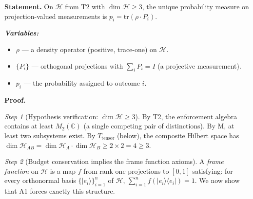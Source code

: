 \documentclass[11pt]{article}
\newenvironment{varlist}{\begin{itemize}[nosep,leftmargin=2em]}{\end{itemize}}
\begin{document}
\begin{tcolorbox}[apfbox, title={$T_{\mathrm{Born}}$: Born Rule from Admissibility Invariance}]
\textbf{Statement.}  On $\mathcal{H}$ from T2 with $\dim \mathcal{H} \ge 3$, the unique probability measure on projection-valued measurements is $p_i = \mathrm{tr}(\rho \cdot P_i)$.

\smallskip\noindent\textbf{\textit{Variables:}}
\begin{varlist}
\item $\rho$ --- a density operator (positive, trace-one) on $\mathcal{H}$.
\item $\{P_i\}$ --- orthogonal projections with $\sum_i P_i = I$ (a projective measurement).
\item $p_i$ --- the probability assigned to outcome $i$.
\end{varlist}

\smallskip\noindent\textbf{Proof.}

\textit{Step 1} (Hypothesis verification: $\dim \mathcal{H} \ge 3$).  By T2, the enforcement algebra contains at least $M_2(\mathbb{C})$ (a single competing pair of distinctions).  By M, at least two subsystems exist.  By $T_{\mathrm{tensor}}$ (below), the composite Hilbert space has $\dim \mathcal{H}_{AB} = \dim \mathcal{H}_A \cdot \dim \mathcal{H}_B \ge 2 \times 2 = 4 \ge 3$.

\textit{Step 2} (Budget conservation implies the frame function axioms).  A \textit{frame function} on $\mathcal{H}$ is a map $f$ from rank-one projections to $[0,1]$ satisfying: for every orthonormal basis $\{|e_i\rangle\}_{i=1}^n$ of $\mathcal{H}$, $\sum_{i=1}^n f(|e_i\rangle\langle e_i|) = 1$.  We now show that A1 forces exactly this structure.


\end{tcolorbox}
\end{document}
